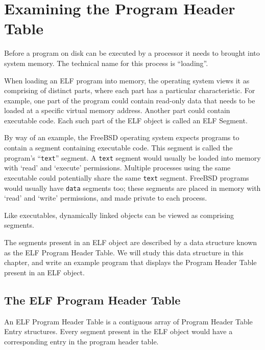 \documentclass[a4paper,pdftex]{book}
\newcommand{\filename}[1]{\texttt{#1}}
\newcommand{\trade}{{\small\texttrademark}\xspace}
\newcommand{\elfdatastructure}[1]{\textsf{#1}}
\begin{document}
\chapter{Examining the Program Header Table}\label{chap.elf-phdr}

Before a program on disk can be executed by a processor it needs to
brought into system memory. The technical name for this process is
``loading''.

When loading an ELF program into memory, the operating system views it
as comprising of distinct parts, where each part has a particular
characteristic. For example, one part of the program could contain
read-only data that needs to be loaded at a specific virtual memory
address. Another part could contain executable code.
Each such part of the ELF object is called an ELF
\elfdatastructure{Segment}.

By way of an example, the FreeBSD\trade operating system expects
programs to contain a segment containing executable
code. This segment is called the
program's ``\filename{text}'' segment. A \filename{text} segment would
usually be loaded into memory with `read' and `execute' permissions.
Multiple processes using the same executable could potentially share
the same \filename{text} segment.  FreeBSD programs would usually have
\filename{data} segments too; these segments are placed in memory with
`read' and `write' permissions, and made private to each process.

Like executables, dynamically linked objects can be viewed as
comprising segments.

The segments present in an ELF object are described by a data
structure known as the ELF \elfdatastructure{Program Header
  Table}. We will study this data
structure in this chapter, and write an example program that displays
the \elfdatastructure{Program Header Table} present in an ELF object.

\section{The ELF Program Header Table}

An ELF \elfdatastructure{Program Header Table} is a contiguous array
of \elfdatastructure{Program Header Table Entry} structures.  Every
segment present in the ELF object would have a corresponding entry in
the program header table.
\end{document}
